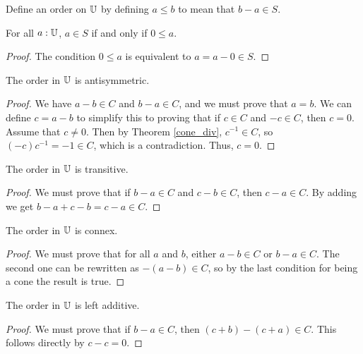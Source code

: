\documentclass[../../math.tex]{subfiles}
\begin{document}
\begin{instance}
    Define an order on $\mathbb{U}$ by defining $a \leq b$ to mean that $b - a \in S$.
\end{instance}

\begin{theorem} \label{cone_pos}
    For all $a : \mathbb{U}$, $a \in S$ if and only if $0 \leq a$.
\end{theorem}
\begin{proof}
    The condition $0 \leq a$ is equivalent to $a = a - 0 \in S$.
\end{proof}

\begin{instance}
    The order in $\mathbb{U}$ is antisymmetric.
\end{instance}
\begin{proof}
    We have $a - b \in C$ and $b - a \in C$, and we must prove that $a = b$.  We
    can define $c = a - b$ to simplify this to proving that if $c \in C$ and $-c
    \in C$, then $c = 0$.  Assume that $c \neq 0$.  Then by Theorem
    \ref{cone_div}, $c^{-1} \in C$, so $(-c)c^{-1} = -1 \in C$, which is a
    contradiction.  Thus, $c = 0$.
\end{proof}

\begin{instance}
    The order in $\mathbb{U}$ is transitive.
\end{instance}
\begin{proof}
    We must prove that if $b - a \in C$ and $c - b \in C$, then $c - a \in C$.
    By adding we get $b - a + c - b = c - a \in C$.
\end{proof}

\begin{instance}
    The order in $\mathbb{U}$ is connex.
\end{instance}
\begin{proof}
    We must prove that for all $a$ and $b$, either $a - b \in C$ or $b - a \in
    C$.  The second one can be rewritten as $-(a - b) \in C$, so by the last
    condition for being a cone the result is true.
\end{proof}

\begin{instance}
    The order in $\mathbb{U}$ is left additive.
\end{instance}
\begin{proof}
    We must prove that if $b - a \in C$, then $(c + b) - (c + a) \in C$.  This
    follows directly by $c - c = 0$.
\end{proof}
\end{document}
